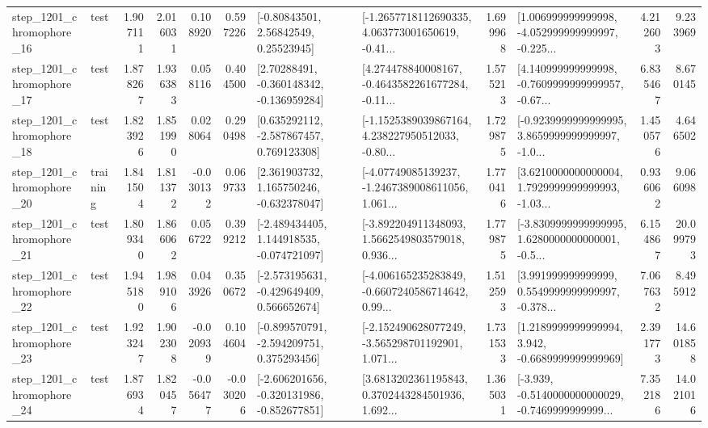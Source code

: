 \begin{tabular}{llrrrrllrlrr}
 step\_1201\_chromophore\_16 &      test &      1.907111 &    2.016031 &      0.108920 &  0.597226 &       [-0.80843501, 2.56842549, 0.25523945] &  [-1.2657718112690335, 4.063773001650619, -0.41... &       1.699968 &  [1.006999999999998, -4.052999999999997, -0.225... &            4.212603 &          9.233969 \\
 step\_1201\_chromophore\_17 &      test &      1.878267 &    1.936383 &      0.058116 &  0.404500 &    [2.70288491, -0.360148342, -0.136959284] &  [4.274478840008167, -0.4643582261677284, -0.11... &       1.575213 &  [4.140999999999998, -0.7609999999999957, -0.67... &            6.835467 &          8.670145 \\
 step\_1201\_chromophore\_18 &      test &      1.823926 &    1.851990 &      0.028064 &  0.290498 &    [0.635292112, -2.587867457, 0.769123308] &  [-1.1525389039867164, 4.238227950512033, -0.80... &       1.729875 &  [-0.9239999999999995, 3.8659999999999997, -1.0... &            1.450576 &          4.646502 \\
 step\_1201\_chromophore\_20 &  training &      1.841504 &    1.811372 &     -0.030132 &  0.069733 &    [2.361903732, 1.165750246, -0.632378047] &  [-4.07749085139237, -1.2467389008611056, 1.061... &       1.770416 &  [3.6210000000000004, 1.7929999999999993, -1.03... &            0.936062 &          9.066098 \\
 step\_1201\_chromophore\_21 &      test &      1.809340 &    1.866062 &      0.056722 &  0.399212 &   [-2.489434405, 1.144918535, -0.074721097] &  [-3.892204911348093, 1.5662549803579018, 0.936... &       1.779875 &  [-3.8309999999999995, 1.6280000000000001, -0.5... &            6.154867 &         20.099793 \\
 step\_1201\_chromophore\_22 &      test &      1.945180 &    1.989106 &      0.043926 &  0.350672 &   [-2.573195631, -0.429649409, 0.566652674] &  [-4.006165235283849, -0.6607240586714642, 0.99... &       1.512593 &  [3.991999999999999, 0.5549999999999997, -0.378... &            7.067632 &          8.495912 \\
 step\_1201\_chromophore\_23 &      test &      1.923247 &    1.902308 &     -0.020939 &  0.104604 &   [-0.899570791, -2.594209751, 0.375293456] &  [-2.152490628077249, -3.565298701192901, 1.071... &       1.731533 &   [1.2189999999999994, 3.942, -0.6689999999999969] &            2.391773 &         14.601858 \\
 step\_1201\_chromophore\_24 &      test &      1.876934 &    1.820457 &     -0.056477 & -0.030206 &  [-2.606201656, -0.320131986, -0.852677851] &  [3.6813202361195843, 0.3702443284501936, 1.692... &       1.365031 &  [-3.939, -0.5140000000000029, -0.7469999999999... &            7.352186 &         14.021016 \\

\end{tabular}
